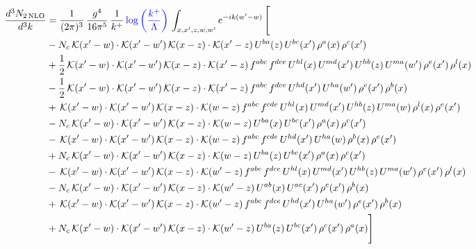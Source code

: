 \documentclass[9pt]{article}
\numberwithin{equation}{section}
\begin{document}
\begin{align}
\frac{d^{3}N_{2\,\mathrm{NLO}}}{d^{3}k} & = \frac{1}{(2\pi)^{3}}\,\frac{g^{4}}{16\pi^{5}}\,\frac{1}{k^{+}}\,{\color{blue}\log{\left(\frac{k^{+}}{\Lambda}\right)}}\,\int_{x,x',z,w,w'}e^{-ik(w'-w)}\,\Bigg[\notag\\ & -N_{c}\,\mathcal{K}(x'-w)\cdot\mathcal{K}(x'-w')\,\mathcal{K}(x-z)\cdot\mathcal{K}(x'-z)\,U^{ba}(z)\,U^{bc}(x')\,\rho^{a}(x)\,\rho^{c}(x')\notag\\
& +\frac{1}{2}\,\mathcal{K}(x'-w)\cdot\mathcal{K}(x'-w')\,\mathcal{K}(x-z)\cdot\mathcal{K}(x'-z)\,f^{abc}\,f^{dce}\,U^{hl}(x)\,U^{md}(x')\,U^{hb}(z)\,U^{ma}(w')\,\rho^{e}(x')\,\rho^{l}(x)\notag\\
& -\frac{1}{2}\,\mathcal{K}(x'-w)\cdot\mathcal{K}(x'-w')\,\mathcal{K}(x-z)\cdot\mathcal{K}(x'-z)\,f^{abc}\,f^{dce}\,U^{hd}(x')\,U^{ha}(w')\,\rho^{e}(x')\,\rho^{b}(x)\notag\\
& +\,\mathcal{K}(x'-w)\cdot\mathcal{K}(x'-w')\,\mathcal{K}(x-z)\cdot\mathcal{K}(w-z)\,f^{abc}\,f^{cde}\,U^{hl}(x)\,U^{md}(x')\,U^{hb}(z)\,U^{ma}(w)\,\rho^{l}(x)\,\rho^{e}(x')\notag\\
& -N_{c}\,\mathcal{K}(x'-w)\cdot\mathcal{K}(x'-w')\,\mathcal{K}(x-z)\cdot\mathcal{K}(w-z)\,U^{ba}(x)\,U^{bc}(x')\,\rho^{a}(x)\,\rho^{c}(x')\notag\\
& -\,\mathcal{K}(x'-w)\cdot\mathcal{K}(x'-w')\,\mathcal{K}(x-z)\cdot\mathcal{K}(w-z)\,f^{abc}\,f^{cde}\,U^{hd}(x')\,U^{ha}(w)\,\rho^{b}(x)\,\rho^{e}(x')\notag\\
& +N_{c}\,\mathcal{K}(x'-w)\cdot\mathcal{K}(x'-w')\,\mathcal{K}(x-z)\cdot\mathcal{K}(w-z)\,U^{ba}(z)\,U^{bc}(x')\,\rho^{a}(x)\,\rho^{c}(x')\notag\\
& -\,\mathcal{K}(x'-w)\cdot\mathcal{K}(x'-w')\,\mathcal{K}(x-z)\cdot\mathcal{K}(w'-z)\,f^{abc}\,f^{dce}\,U^{hl}(x)\,U^{md}(x')\,U^{hb}(z)\,U^{ma}(w')\,\rho^{e}(x')\,\rho^{l}(x)\notag\\
& -N_{c}\,\mathcal{K}(x'-w)\cdot\mathcal{K}(x'-w')\,\mathcal{K}(x-z)\cdot\mathcal{K}(w'-z)\,U^{ab}(x)\,U^{ac}(x')\,\rho^{c}(x')\,\rho^{b}(x)\notag\\
& +\,\mathcal{K}(x'-w)\cdot\mathcal{K}(x'-w')\,\mathcal{K}(x-z)\cdot\mathcal{K}(w'-z)\,f^{abc}\,f^{dce}\,U^{hd}(x')\,U^{ha}(w')\,\rho^{e}(x')\,\rho^{b}(x)\notag\\
& +N_{c}\,\mathcal{K}(x'-w)\cdot\mathcal{K}(x'-w')\,\mathcal{K}(x-z)\cdot\mathcal{K}(w'-z)\,U^{ba}(z)\,U^{bc}(x')\,\rho^{c}(x')\,\rho^{a}(x)\Bigg]
\end{align}
\end{document}
